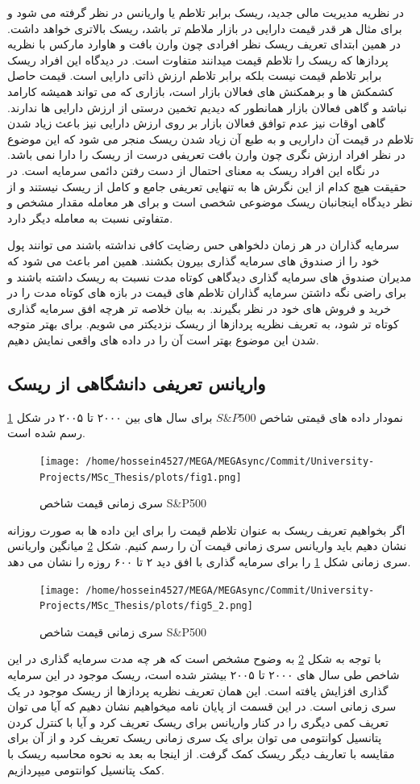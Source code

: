 \documentclass[a4paper,titlepage,12pt,fleqn,oneside]{report}
\begin{document}
در نظریه مدیریت مالی جدید، ریسک برابر تلاطم یا واریانس در نظر گرفته می شود و برای مثال هر قدر قیمت دارایی در بازار ملاطم تر باشد، ریسک بالاتری خواهد داشت. در همین ابتدای تعریف ریسک نظر افرادی چون وارن بافت و هاوارد مارکس با نظریه پردازها که ریسک را تلاطم قیمت میدانند متفاوت است. در دیدگاه این افراد ریسک برابر تلاطم قیمت نیست بلکه برابر تلاطم ارزش ذاتی دارایی است. قیمت حاصل کشمکش ها و برهمکنش های فعالان بازار است، بازاری که می تواند همیشه کارامد نباشد و گاهی فعالان بازار همانطور که دیدیم تخمین درستی از ارزش دارایی ها ندارند. گاهی اوقات نیز عدم توافق فعالان بازار بر روی ارزش دارایی نیز باعث زیاد شدن تلاطم در قیمت آن داراریی و به طبع آن زیاد شدن ریسک منجر می شود که این موضوع در نظر افراد ارزش نگری چون وارن بافت تعریفی درست از ریسک را دارا نمی باشد. در نگاه این افراد ریسک به معنای احتمال از دست رفتن دائمی سرمایه است. در حقیقت هیچ کدام از این نگرش ها به تنهایی تعریفی جامع و کامل از ریسک نیستند و از نظر دیدگاه اینجانبان ریسک موضوعی شخصی است و برای هر معامله مقدار مشخص و متفاوتی نسبت به معامله دیگر دارد.

سرمایه گذاران در هر زمان دلخواهی حس رضایت کافی نداشته باشند می توانند پول خود را از صندوق های سرمایه گذاری بیرون بکشند. همین امر باعث می شود که مدیران صندوق های سرمایه گذاری دیدگاهی کوتاه مدت نسبت به ریسک داشته باشند و برای راضی نگه داشتن سرمایه گذاران  تلاطم های قیمت در بازه های کوتاه مدت را در خرید و فروش های خود در نظر بگیرند.  به بیان خلاصه تر هرچه افق سرمایه گذاری کوتاه تر شود، به تعریف نظریه پردازها از ریسک نزدیکتر می شویم. برای بهتر متوجه شدن این موضوع بهتر است آن را در داده های واقعی نمایش دهیم.

\subsection{واریانس تعریفی دانشگاهی از ریسک}
نمودار داده های قیمتی شاخص
$S\&P500$
برای سال های بین ۲۰۰۰ تا ۲۰۰۵ در شکل 
\ref{fig:5.1}
 رسم شده است.
\begin{figure}[ptb]
	\centering
	\texttt{[image: /home/hossein4527/MEGA/MEGAsync/Commit/University-Projects/MSc\_Thesis/plots/fig1.png]}
	\caption{سری زمانی قیمت شاخص S\&P500}
	\label{fig:5.1}
\end{figure}
اگر بخواهیم تعریف ریسک به عنوان تلاطم قیمت را برای این داده ها به صورت روزانه نشان دهیم باید واریانس سری زمانی قیمت آن را رسم کنیم. شکل
\ref{fig:5.2}
میانگین واریانس سری زمانی شکل 
\ref{fig:5.1}
را برای سرمایه گذاری با افق دید ۲ تا ۶۰۰ روزه را نشان می دهد. 
\begin{figure}[ptb]
	\centering
	\texttt{[image: /home/hossein4527/MEGA/MEGAsync/Commit/University-Projects/MSc\_Thesis/plots/fig5\_2.png]}
	\caption{سری زمانی قیمت شاخص S\&P500}
	\label{fig:5.2}
\end{figure}
با توجه به شکل
\ref{fig:5.2}
به وضوح مشخص است که هر چه مدت  سرمایه گذاری در این شاخص طی سال های ۲۰۰۰ تا ۲۰۰۵ بیشتر شده است، ریسک موجود در این سرمایه گذاری افزایش یافته است.  این همان تعریف نظریه پردازها از ریسک موجود در یک سری زمانی است. در این قسمت از پایان  نامه میخواهیم نشان دهیم  که آیا می توان تعریف کمی دیگری را در کنار واریانس برای ریسک تعریف کرد و آیا با کنترل کردن پتانسیل کوانتومی می توان برای یک سری زمانی ریسک تعریف کرد و از آن برای مقایسه با تعاریف دیگر ریسک کمک گرفت. از اینجا به بعد به نحوه محاسبه ریسک با کمک پتانسیل کوانتومی میپردازیم.
\end{document}
